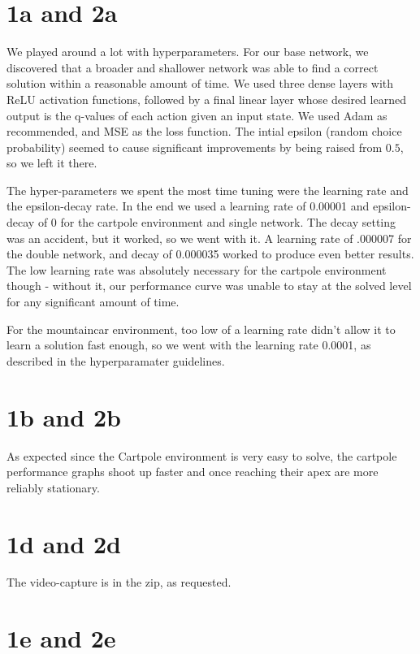 \documentclass[12pt]{article}
\begin{document}
\begin{solution}
\section{1a and 2a}
We played around a lot with hyperparameters. For our base network, we discovered that a broader and shallower network was able to find a correct solution within a reasonable amount of time. We used three dense layers with ReLU activation functions, followed by a final linear layer whose desired learned output is the q-values of each action given an input state. We used Adam as recommended, and MSE as the loss function. The intial epsilon (random choice probability) seemed to cause significant improvements by being raised from $0.5$, so we left it there.

The hyper-parameters we spent the most time tuning were the learning rate and the epsilon-decay rate. In the end we used a learning rate of 0.00001 and epsilon-decay of 0 for the cartpole environment and single network. The decay setting was an accident, but it worked, so we went with it. A learning rate of .000007 for the double network, and decay of 0.000035 worked to produce even better results. The low learning rate was absolutely necessary for the cartpole environment though - without it, our performance curve was unable to stay at the solved level for any significant amount of time.

For the mountaincar environment, too low of a learning rate didn't allow it to learn a solution fast enough, so we went with the learning rate 0.0001, as described in the hyperparamater guidelines.

\section{1b and 2b}

As expected since the Cartpole environment is very easy to solve, the cartpole performance graphs shoot up faster and once reaching their apex are more reliably stationary.

\section{1d and 2d}
The video-capture is in the zip, as requested.

\section{1e and 2e}


\end{solution}
\end{document}
